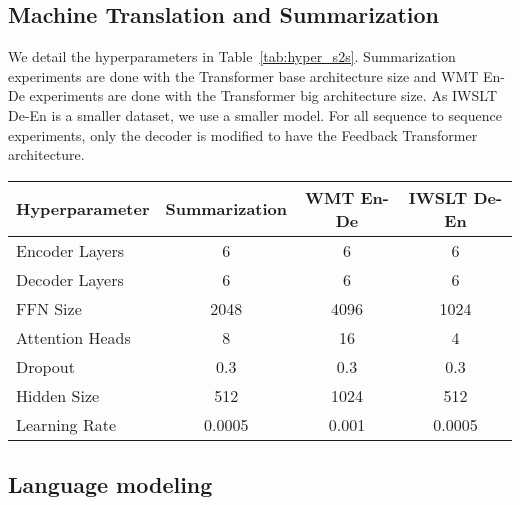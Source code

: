 \documentclass{article} \usepackage{iclr2021_conference}
\begin{document}
\subsection{Machine Translation and Summarization}

We detail the hyperparameters in Table~\ref{tab:hyper_s2s}. Summarization experiments are done with the Transformer base architecture size and WMT En-De experiments are done with the Transformer big architecture size. As IWSLT De-En is a smaller dataset, we use a smaller model. For all sequence to sequence experiments, only the decoder is modified to have the Feedback Transformer architecture. 

\begin{table*}[t]
    \centering
    \begin{tabular}{lccc}
    \toprule
    Hyperparameter & Summarization & WMT En-De & IWSLT De-En  \\
    \midrule
    Encoder Layers & 6 & 6 & 6 \\ 
    Decoder Layers & 6 & 6 & 6 \\ 
    FFN Size & 2048 & 4096 & 1024 \\ 
    Attention Heads & 8 & 16 & 4 \\
    Dropout & 0.3 & 0.3 & 0.3 \\ 
    Hidden Size & 512 & 1024 & 512 \\  
    Learning Rate & 0.0005 & 0.001 & 0.0005 \\ 
    \bottomrule
    \end{tabular}
    \caption{Hyperparamers for sequence to sequence experiments.}
    \label{tab:hyper_s2s}
\end{table*}

\subsection{Language modeling}
\end{document}
